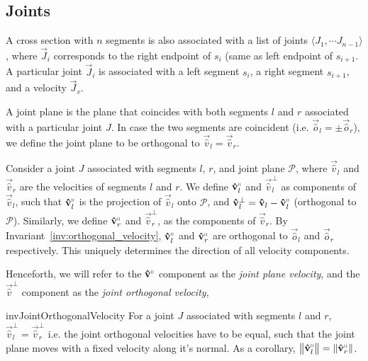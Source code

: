 \subsection{Joints}
\label{sec:joints}

\begin{definition}
\label{def:joints}
A cross section with $n$ segments is also associated with a list of joints
$ \langle J_1,\cdots J_{n-1} \rangle$,
where $\vec J_i$ corresponds to the right endpoint of $s_i$ (same as left endpoint of $s_{i+1}$.
A particular joint $\vec J_i$ is associated with a left segment $s_i$,
a right segment $s_{i+1}$, and a velocity $\vec J_v$.
\end{definition}

\begin{definition}
\label{def:joint_plane}
A joint plane is the plane that coincides with both segments $l$ and $r$ associated with a particular joint $J$.
In case the two segments are coincident (i.e. $\vec{\hat o}_l = \pm \vec{\hat o}_r$),
we define the joint plane to be orthogonal to $\vec{\hat v}_l = \vec{\hat v}_r$.
\end{definition}

\begin{definition}
\label{def:joint_plane_velocity}
Consider a joint $J$ associated with segments $l$, $r$, and joint plane $\mathcal P$,
where $\vec{\hat v}_l$ and $\vec{\hat v}_r$ are the velocities of segments $l$ and $r$.
We define $\vec{\hat v}_l^\shortparallel$ and $\vec{\hat v}_l^\perp$ as components of
$\vec{\hat v}_l$, such that $\vec{\hat v}_l^\shortparallel$ is the projection of $\vec{\hat v}_l$
onto $\mathcal P$, and $\vec{\hat v}_l^\perp = \vec{\hat v}_l - \vec{\hat v}_l^\shortparallel$
(orthogonal to $\mathcal P$).
Similarly, we define $\vec{\hat v}_r^\shortparallel$ and $\vec{\hat v}_r^\perp$, as the components of $\vec{\hat v}_r$.
By Invariant~\ref{inv:orthogonal_velocity}, $\vec{\hat v}_l^\shortparallel$ and $\vec{\hat v}_r^\shortparallel$
are orthogonal to $\vec{\hat o}_l$ and $\vec{\hat o}_r$ respectively.
This uniquely determines the direction of all velocity components.
\end{definition}

Henceforth, we will refer to the $\vec{\hat v}^\shortparallel$ component as the \emph{joint plane velocity},
and the $\vec{\hat v}^\perp$ component as the \emph{joint orthogonal velocity,}

\begin{restatable}{inv}{JointOrthogonalVelocity}
\label{inv:joint_orthogonal_velocity}
For a joint $J$ associated with segments $l$ and $r$, $\vec{\hat v}_l^\perp = \vec{\hat v}_r^\perp$
i.e. the joint orthogonal velocities have to be equal, such that the joint plane moves with a fixed velocity along it's normal.
As a corollary, $ \left\| \vec{\hat v}_l^\shortparallel\right\| = \left\| \vec{\hat v}_r^\shortparallel\right\|$.
\end{restatable}
